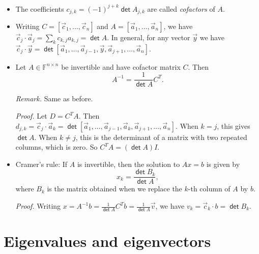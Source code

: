 \documentclass[11pt]{article}
\newcommand{\1}{\mathbf{1}}
\newcommand{\0}{\mathbf{0}}
\newcommand{\F}{\mathbb{F}}
\DeclareMathOperator{\mydet}{\mathsf{det}}
\DeclareMathOperator{\mydot}{\boldsymbol{\cdot}}
\newcommand{\va}{\vec{a}}
\newcommand{\vc}{\vec{c}}
\newcommand{\vy}{\vec{y}}
\newcommand{\vv}{\vec{v}}
\newcommand{\spitem}{\item[$\circ$]}
\begin{document}
\begin{itemize}
\item

The coefficients $c_{j,k}=(-1)^{j+k}\mydet A_{j,k}$ are called \emph{cofactors} of $A$.

\spitem

Writing $C = [\vc_1,\dots,\vc_n]$ and $A=[\va_1,\dots,\va_n]$, we have $\vc_j \mydot \va_j = \sum_k c_{k,j} a_{k,j} = \mydet A$.
In general, for any vector $\vy$ we have $\vc_j \mydot \vy = \mydet [\va_1,\dots,\va_{j-1},\vy,\va_{j+1},\dots,\va_n]$.

\item

Let $A\in\F^{n \times n}$ be invertible and have cofactor matrix $C$. Then
\[
A^{-1}=\frac{1}{\mydet A}C^T.
\]

\emph{Remark.}
Same as before.

\emph{Proof.}
Let $D = C^T\! A$.
Then $d_{j,k} = \vc_j \mydot \va_k = \mydet [\va_1,\dots,\va_{j-1},\va_k,\va_{j+1},\dots,\va_n]$.
When $k=j$, this gives $\mydet A$.
When $k \ne j$, this is the determinant of a matrix with two repeated columns, which is zero.
So $C^T\! A = (\mydet A) I$.

\item

Cramer's rule: If $A$ is invertible, then the solution to $Ax=b$ is given by
\[
x_k=\frac{\mydet B_k}{\mydet A},
\]
where $B_k$ is the matrix obtained when we replace the $k$-th column of $A$ by $b$.

\emph{Proof.}
Writing $x = A^{-1}b = \frac{1}{\mydet A} C^T b = \frac{1}{\mydet A} \vv$, we have $v_k = \vc_k \mydot b = \mydet B_k$.

%
%
%
%
%

\end{itemize}


\clearpage
\section{Eigenvalues and eigenvectors}
\end{document}
